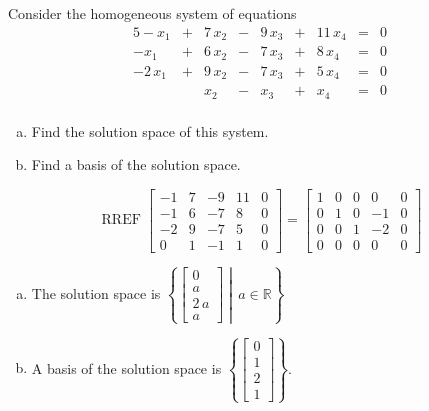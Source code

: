 
\begin{exerciseStatement}


Consider the homogeneous system of equations 
\begin{alignat*}{5} -x_{1} &+& 7 \, x_{2} &-& 9 \, x_{3} &+& 11 \, x_{4} &=& 0 \\-x_{1} &+& 6 \, x_{2} &-& 7 \, x_{3} &+& 8 \, x_{4} &=& 0 \\-2 \, x_{1} &+& 9 \, x_{2} &-& 7 \, x_{3} &+& 5 \, x_{4} &=& 0 \\ & & x_{2} &-& x_{3} &+& x_{4} &=& 0 \\ \end{alignat*}
            


\begin{enumerate}[(a)]
\item  Find the solution space of this system.
\item  Find a basis of the solution space.
\end{enumerate}
    
\end{exerciseStatement}
    
\begin{exerciseAnswer} 


\[\operatorname{RREF} \left[\begin{array}{cccc|c}
-1 & 7 & -9 & 11 & 0 \\
-1 & 6 & -7 & 8 & 0 \\
-2 & 9 & -7 & 5 & 0 \\
0 & 1 & -1 & 1 & 0
\end{array}\right] = \left[\begin{array}{cccc|c}
1 & 0 & 0 & 0 & 0 \\
0 & 1 & 0 & -1 & 0 \\
0 & 0 & 1 & -2 & 0 \\
0 & 0 & 0 & 0 & 0
\end{array}\right] \]


\begin{enumerate}[(a)]
\item The solution space is \( \left\{ \left[\begin{array}{c}
0 \\
a \\
2 \, a \\
a
\end{array}\right] \middle|\,a\in\mathbb{R}\right\} \)
\item A basis of the solution space is \( \left\{ \left[\begin{array}{c}
0 \\
1 \\
2 \\
1
\end{array}\right] \right\} \).
\end{enumerate}
    
\end{exerciseAnswer}
    
